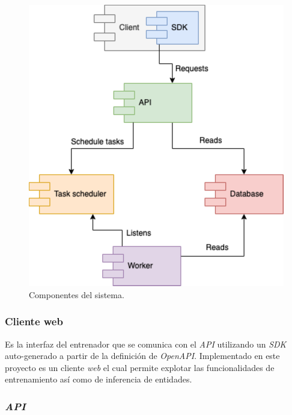 \documentclass[12pt,a4paper,]{scrartcl}
\begin{document}
\begin{figure}[H]

{\centering \includegraphics{assets/process/process-overview-client.pdf} 

}

\caption{Componentes del sistema.}\label{fig:process-overview-client}
\end{figure}

\hypertarget{cliente-web}{%
\subsubsection{Cliente web}\label{cliente-web}}

Es la interfaz del entrenador que se comunica con el \emph{API} utilizando un \emph{SDK} auto-generado a partir de la definición de \emph{OpenAPI}. Implementado en este proyecto es un cliente \emph{web} el cual permite explotar las funcionalidades de entrenamiento así como de inferencia de entidades.

\hypertarget{api-1}{%
\subsubsection{\texorpdfstring{\emph{API}}{API}}\label{api-1}}
\end{document}
